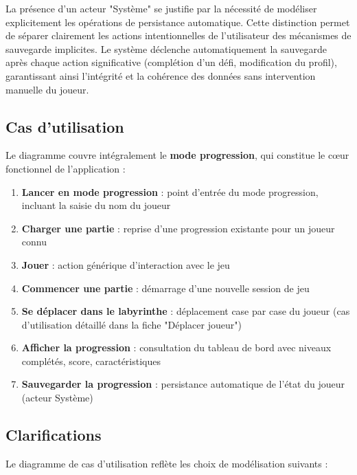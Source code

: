 \documentclass{butexFR}
\begin{document}
La présence d'un acteur "Système" se justifie par la nécessité de modéliser explicitement les opérations de persistance automatique. Cette distinction permet de séparer clairement les actions intentionnelles de l'utilisateur des mécanismes de sauvegarde implicites. Le système déclenche automatiquement la sauvegarde après chaque action significative (complétion d'un défi, modification du profil), garantissant ainsi l'intégrité et la cohérence des données sans intervention manuelle du joueur.

\subsection{Cas d'utilisation}

Le diagramme couvre intégralement le \textbf{mode progression}, qui constitue le cœur fonctionnel de l'application :

\begin{enumerate}
    \item \textbf{Lancer en mode progression} : point d'entrée du mode progression, incluant la saisie du nom du joueur
    \item \textbf{Charger une partie} : reprise d'une progression existante pour un joueur connu
    \item \textbf{Jouer} : action générique d'interaction avec le jeu
    \item \textbf{Commencer une partie} : démarrage d'une nouvelle session de jeu
    \item \textbf{Se déplacer dans le labyrinthe} : déplacement case par case du joueur (cas d'utilisation détaillé dans la fiche "Déplacer joueur")
    \item \textbf{Afficher la progression} : consultation du tableau de bord avec niveaux complétés, score, caractéristiques
    \item \textbf{Sauvegarder la progression} : persistance automatique de l'état du joueur (acteur Système)
\end{enumerate}

\subsection{Clarifications}

Le diagramme de cas d'utilisation reflète les choix de modélisation suivants :
\end{document}
